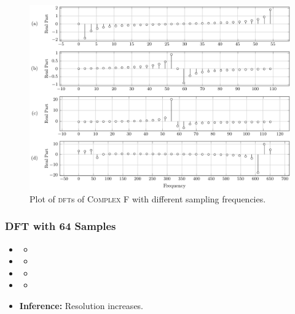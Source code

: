 \documentclass[../../course]{subfiles}
\begin{document}
\vfill

\begin{figure} [H]
    \centering
     {
        \includegraphics[height = 0.8\textheight] {tikzpics/plotDftComplexF32.pdf}
    }
     {Plot of \textsc{dft}s of \textsc{Complex F} with different sampling frequencies.}
    \label{plt:dftCplxF32}
\end{figure}

\subsubsection{DFT with 64 Samples}

\begin{itemize} [label=]

    \item \sampFreqMuchLess
        \begin{itemize} [label=]
            \item
        \end{itemize}

    \item \sampFreqNorm
        \begin{itemize} [label=]
            \item
        \end{itemize}

    \item \sampFreqSligGreat
        \begin{itemize} [label=]
            \item
        \end{itemize}

    \item \sampFreqMuchGreat
        \begin{itemize} [label=]
            \item
        \end{itemize}

    \item \textbf{Inference:} Resolution increases.

\end{itemize}
\end{document}
